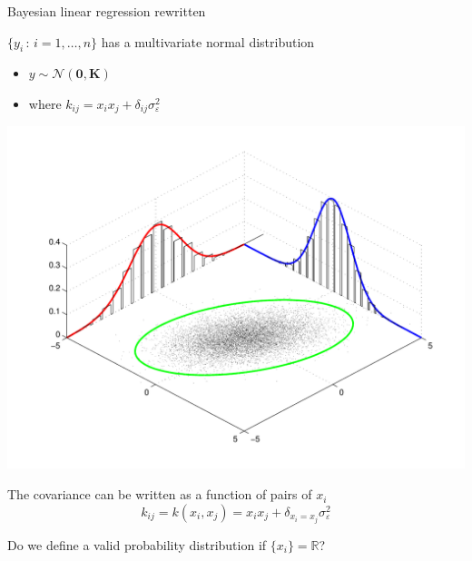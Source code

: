 \begin{frame}{Bayesian linear regression rewritten}
      \fboxsep=0pt
	\noindent
		\begin{minipage}[t]{0.48\linewidth}
		  \vspace{-5.5\baselineskip}
			$\{y_i \,:\, i=1,\ldots,n\}$ has a multivariate normal distribution
    \begin{itemize}
      \item $y \sim \mathcal{N}(\mathbf{0}, \mathbf{K})$
      \item where $k_{ij} = x_i x_j + \delta_{ij} \sigma_\varepsilon^2$
    \end{itemize}
		\end{minipage}
		\hfill
		\begin{minipage}[t]{0.48\linewidth}
		\begin{center}
		  \includegraphics[width=0.9\linewidth]{figures/multi_norm}
		\end{center}
		\end{minipage}
  
  \vspace{\baselineskip}
  \pause
  
  The covariance can be written as a function of pairs of $x_i$
  \begin{equation*}
    k_{ij} = k(x_i, x_j) = x_i x_j + \delta_{x_i = x_j}\sigma_\varepsilon^2
  \end{equation*}
  
  \vspace{\baselineskip}
  \pause
  
  Do we define a valid probability distribution if $\{x_i\} = \mathbb{R}$?
\end{frame}

